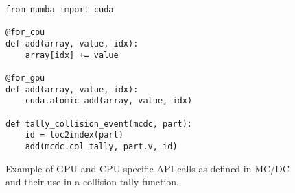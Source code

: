
\begin{figure}
\begin{verbatim}
from numba import cuda

@for_cpu
def add(array, value, idx):
    array[idx] += value

@for_gpu
def add(array, value, idx):
    cuda.atomic_add(array, value, idx)

def tally_collision_event(mcdc, part):
    id = loc2index(part)
    add(mcdc.col_tally, part.v, id)
\end{verbatim}
\caption{Example of GPU and CPU specific API calls as defined in MC/DC and their use in a collision tally function.}
\label{fig:forcpuvgpu}
\end{figure}